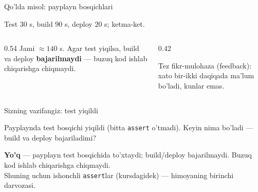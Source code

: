\documentclass[aspectratio=169,11pt]{beamer}
\begin{document}
\begin{frame}{Qo'lda misol: payplayn bosqichlari}
  \begin{tcolorbox}[defbox,title={Payplayn: test -> build -> deploy}]
    \small Test $30$ s, build $90$ s, deploy $20$ s; ketma-ket.
  \end{tcolorbox}
  \vspace{0.2em}
  \begin{columns}[T]
    \begin{column}{0.54\textwidth}
      \footnotesize
      Jami $\approx 140$ s. Agar test yiqilsa, build va deploy
      \textbf{bajarilmaydi} --- buzuq kod ishlab chiqarishga chiqmaydi.
    \end{column}
    \begin{column}{0.42\textwidth}
      \begin{tcolorbox}[okbox,top=2pt,bottom=2pt]
        \footnotesize
        Tez fikr-mulohaza (feedback): xato bir-ikki daqiqada ma'lum bo'ladi,
        kunlar emas.
      \end{tcolorbox}
    \end{column}
  \end{columns}
\end{frame}

\begin{frame}{Sizning vazifangiz: test yiqildi}
  \begin{tcolorbox}[warnbox,title=Savol --- 60 soniya]
    \small
    Payplaynda test bosqichi yiqildi (bitta \texttt{assert} o'tmadi). Keyin nima
    bo'ladi --- build va deploy bajariladimi?
  \end{tcolorbox}
  \pause
  \begin{tcolorbox}[okbox,title=Javob]
    \small
    \textbf{Yo'q} --- payplayn test bosqichida to'xtaydi; build/deploy
    bajarilmaydi. Buzuq kod ishlab chiqarishga chiqmaydi.\\[3pt]
    \footnotesize Shuning uchun ishonchli \texttt{assert}lar (kursdagidek) ---
    himoyaning birinchi darvozasi.
  \end{tcolorbox}
\end{frame}
\end{document}
